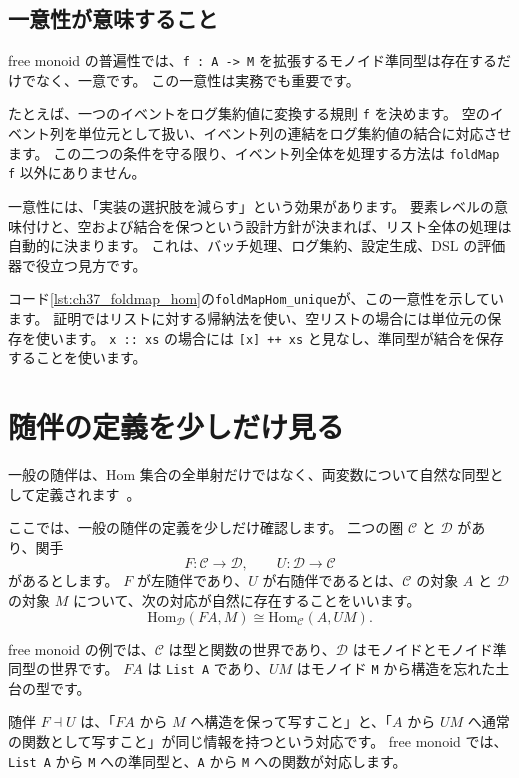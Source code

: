 \subsection{一意性が意味すること}

free monoid の普遍性では、\texttt{f : A -> M} を拡張するモノイド準同型は存在するだけでなく、一意です。
この一意性は実務でも重要です。

たとえば、一つのイベントをログ集約値に変換する規則 \texttt{f} を決めます。
空のイベント列を単位元として扱い、イベント列の連結をログ集約値の結合に対応させます。
この二つの条件を守る限り、イベント列全体を処理する方法は \texttt{foldMap f} 以外にありません。

一意性には、「実装の選択肢を減らす」という効果があります。
要素レベルの意味付けと、空および結合を保つという設計方針が決まれば、リスト全体の処理は自動的に決まります。
これは、バッチ処理、ログ集約、設定生成、DSL の評価器で役立つ見方です。

コード\ref{lst:ch37_foldmap_hom}の\texttt{foldMapHom\_unique}が、この一意性を示しています。
証明ではリストに対する帰納法を使い、空リストの場合には単位元の保存を使います。
\texttt{x :: xs} の場合には \texttt{[x] ++ xs} と見なし、準同型が結合を保存することを使います。

\section{随伴の定義を少しだけ見る}

\label{sec:ch37-adjunction-definition}

一般の随伴は、Hom 集合の全単射だけではなく、両変数について自然な同型として定義されます~\cite{leinster-basic-category-theory,riehl-category-theory-in-context}。

ここでは、一般の随伴の定義を少しだけ確認します。
二つの圏 \(\mathcal{C}\) と \(\mathcal{D}\) があり、関手
\[
  F : \mathcal{C} \to \mathcal{D},
  \qquad
  U : \mathcal{D} \to \mathcal{C}
\]
があるとします。
\(F\) が左随伴であり、\(U\) が右随伴であるとは、\(\mathcal{C}\) の対象 \(A\) と \(\mathcal{D}\) の対象 \(M\) について、次の対応が自然に存在することをいいます。
\[
  \mathrm{Hom}_{\mathcal{D}}(F A, M)
  \cong
  \mathrm{Hom}_{\mathcal{C}}(A, U M).
\]

free monoid の例では、\(\mathcal{C}\) は型と関数の世界であり、\(\mathcal{D}\) はモノイドとモノイド準同型の世界です。
\(F A\) は \texttt{List A} であり、\(U M\) はモノイド \texttt{M} から構造を忘れた土台の型です。

随伴 \(F \dashv U\) は、「\(F A\) から \(M\) へ構造を保って写すこと」と、「\(A\) から \(U M\) へ通常の関数として写すこと」が同じ情報を持つという対応です。
free monoid では、\texttt{List A} から \texttt{M} への準同型と、\texttt{A} から \texttt{M} への関数が対応します。

